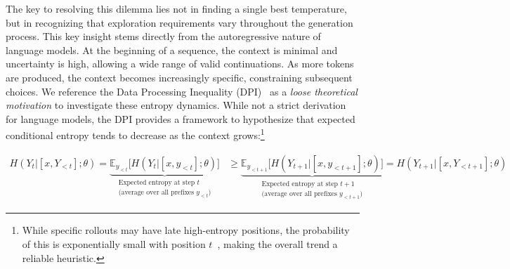 The key to resolving this dilemma lies not in finding a single best temperature, but in recognizing that exploration requirements vary throughout the generation process.
% 
This key insight stems directly from the autoregressive nature of language models.
%
At the beginning of a sequence, the context is minimal and uncertainty is high, allowing a wide range of valid continuations. 
%
As more tokens are produced, the context becomes increasingly specific, constraining subsequent choices.
%
We reference the Data Processing Inequality (DPI)~\citep{shannon1948mathematical} as a \textit{loose theoretical motivation} to investigate these entropy dynamics. While not a strict derivation for language  models, the DPI provides a framework to hypothesize that expected conditional entropy tends to decrease as the context grows:\footnote{While specific rollouts may have late high-entropy positions, the probability of this is exponentially small with position $t$~\citep{yang2025alignment}, making the overall trend a reliable heuristic.}
\vspace{-5pt}
\begin{small}
\begin{equation}
\label{eq:entropy_decay}
\begin{split}
H(Y_t | [x, Y_{<t}]; \theta) = \underbrace{\mathbb{E}_{y_{<t}}\big[ H(Y_t | [x, y_{<t}]; \theta) \big]}_{\substack{\text{Expected entropy at step } t \\ \text{(average over all prefixes } y_{<t}\text{)}}} 
&\geq 
\underbrace{\mathbb{E}_{y_{<t+1}}\big[ H(Y_{t+1} | [x, y_{<t+1}]; \theta) \big]}_{\substack{\text{Expected entropy at step } t+1 \\ \text{(average over all prefixes } y_{<t+1}\text{)}}} = H(Y_{t+1} | [x, Y_{<t+1}]; \theta)\nonumber 
\end{split}
\end{equation}
\end{small}

